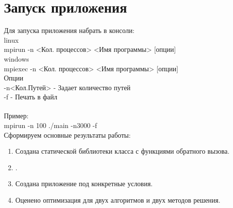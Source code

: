 \section{Запуск приложения}
Для запуска приложения набрать в консоли:\\
linux\\
	mpirun -n <Кол. процессов> <Имя программы> [опции]\\
windows\\
	mpiexec -n <Кол. процессов> <Имя программы> [опции]\\
Опции\\
-n<Кол.Путей> - Задает количество путей\\
-f  - Печать в файл\\
\\
Пример:\\
	mpirun -n 100 ./main -n3000 -f\\
\newpage{}
 Сформируем основные результаты работы:
 \begin{enumerate}
	\item Создана статической библиотеки класса с функциями обратного вызова.
	\item .
	\item Создана приложение под конкретные условия.
	\item Оценено оптимизация для двух алгоритмов и двух методов решения.
\end{enumerate}
